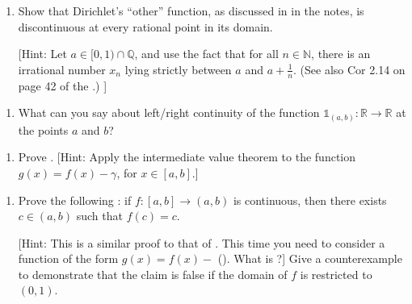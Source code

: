 \documentclass[letterpaper,10pt,english]{jupyterBook}
\begin{document}
\label{\detokenize{Problems:id22}}\begin{enumerate}
%
\setcounter{enumi}{21}
\item {} 
\sphinxAtStartPar
{} Show that Dirichlet’s “other” function, as discussed in  in the notes, is discontinuous at every rational point in its domain.

{[}Hint: Let \(a\in[0,1)\cap\mathbb{Q}\), and use the fact that for all \(n\in\mathbb{N}\), there is an irrational number \(x_n\) lying strictly between \(a\) and \(a+\frac{1}{n}\). (See also Cor 2.14 on page 42 of the .) {]}

\end{enumerate}
\label{\detokenize{Problems:id23}}\begin{enumerate}
%
\setcounter{enumi}{22}
\item {} 
\sphinxAtStartPar
What can you say about left/right continuity of the function  \(\mathbb{1}_{(a, b)}:\mathbb{R}\to\mathbb{R}\) at the points \(a\) and \(b\)?

\end{enumerate}
\label{\detokenize{Problems:id24}}\begin{enumerate}
%
\setcounter{enumi}{23}
\item {} 
\sphinxAtStartPar
Prove . {[}Hint: Apply the intermediate value theorem to the function \(g(x) = f(x) - \gamma\), for \(x \in [a, b]\).{]}

\end{enumerate}
\label{\detokenize{Problems:id25}}\begin{enumerate}
%
\setcounter{enumi}{24}
\item {} 
\sphinxAtStartPar
Prove the following : if \(f:[a,b] \rightarrow (a,b)\) is continuous, then there exists \(c \in (a, b)\) such that \(f(c) = c\).

{[}Hint: This is a similar proof to that of {\hyperref[\detokenize{Problems:id24}]{}}. This time you need to consider a function of the form \(g(x) = f(x) - \) (). What is ?{]} Give a counter\sphinxhyphen{}example to demonstrate that the claim is false if the domain of \(f\) is restricted to \((0, 1)\).

\end{enumerate}
\end{document}
